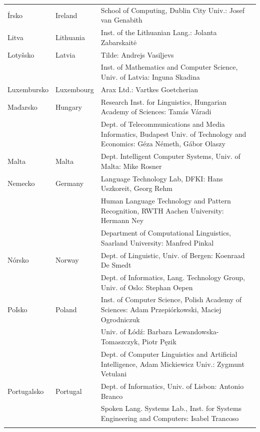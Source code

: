 \begin{longtable}{@{}llp{113mm}@{}}
  Írsko & \textcolor{grey1}{Ireland} & School of Computing, Dublin City Univ.: Josef van Genabith\\ \addlinespace
  Litva & \textcolor{grey1}{Lithuania} & Inst. of the Lithuanian Lang.: Jolanta Zabarskaitė\\ \addlinespace
  Lotyšsko & \textcolor{grey1}{Latvia} & Tilde: Andrejs Vasiļjevs\\ \addlinespace   & & Inst. of Mathematics and Computer Science, Univ. of Latvia: Inguna Skadina\\ \addlinespace
  Luxembursko & \textcolor{grey1}{Luxembourg} & Arax Ltd.: Vartkes Goetcherian\\ \addlinespace
  Maďarsko & \textcolor{grey1}{Hungary} & Research Inst. for Linguistics, Hungarian Academy of Sciences: Tamás Váradi\\  \addlinespace  & & Dept. of Telecommunications and Media Informatics, Budapest Univ. of Technology and Economics: Géza Németh, Gábor Olaszy\\ \addlinespace
  Malta & \textcolor{grey1}{Malta} & Dept. Intelligent Computer Systems, Univ. of Malta: Mike Rosner\\ \addlinespace
  Nemecko & \textcolor{grey1}{Germany} & Language Technology Lab, DFKI: Hans Uszkoreit, Georg Rehm\\ \addlinespace & & Human Language Technology and Pattern Recognition, RWTH Aachen University: Hermann Ney \\ \addlinespace
  & & Department of Computational Linguistics, Saarland University: Manfred Pinkal\\ \addlinespace 
  Nórsko & \textcolor{grey1}{Norway} & Dept. of Linguistic, Univ. of Bergen: Koenraad De Smedt\\ \addlinespace   & & Dept. of Informatics, Lang. Technology Group, Univ. of Oslo: Stephan Oepen \\ \addlinespace
  Poľsko & \textcolor{grey1}{Poland} & Inst. of Computer Science, Polish Academy of Sciences: Adam Przepiórkowski, Maciej Ogrodniczuk \\ \addlinespace  & & Univ. of Łódź: Barbara Lewandowska-Tomaszczyk, Piotr Pęzik\\ \addlinespace  & & Dept. of Computer Linguistics and Artificial Intelligence, Adam Mickiewicz Univ.: Zygmunt Vetulani \\ \addlinespace
  Portugalsko & \textcolor{grey1}{Portugal} & Dept. of Informatics, Univ. of Lisbon: Antonio Branco\\ \addlinespace  & & Spoken Lang. Systems Lab., Inst. for Systems Engineering and Computers: Isabel Trancoso \\ \addlinespace

\end{longtable}
